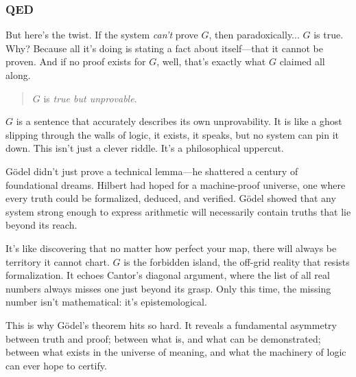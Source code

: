 \vspace{1em}


\subsubsection{QED} 

But here's the twist. If the system \emph{can’t} prove \( G \), then paradoxically... \( G \) is true. Why? Because all it's doing is stating a fact about itself—that it cannot be proven. And if no proof exists for \( G \), well, that’s exactly what \( G \) claimed all along.

\begin{quote}
\( G \) is \emph{true but unprovable}. 
\end{quote}

\( G \) is a sentence that accurately describes its own unprovability. It is like a ghost slipping through the walls of logic, it exists, it speaks, but no system can pin it down. This isn’t just a clever riddle. It’s a philosophical uppercut.

Gödel didn’t just prove a technical lemma—he shattered a century of foundational dreams. Hilbert had hoped for a machine-proof universe, one where every truth could be formalized, deduced, and verified. Gödel showed that any system strong enough to express arithmetic will necessarily contain truths that lie beyond its reach.

It’s like discovering that no matter how perfect your map, there will always be territory it cannot chart. \( G \) is the forbidden island, the off-grid reality that resists formalization. It echoes Cantor’s diagonal argument, where the list of all real numbers always misses one just beyond its grasp. Only this time, the missing number isn’t mathematical: it’s epistemological.

This is why Gödel’s theorem hits so hard. It reveals a fundamental asymmetry between truth and proof; between what is, and what can be demonstrated; between what exists in the universe of meaning, and what the machinery of logic can ever hope to certify.

\vspace{1em}

